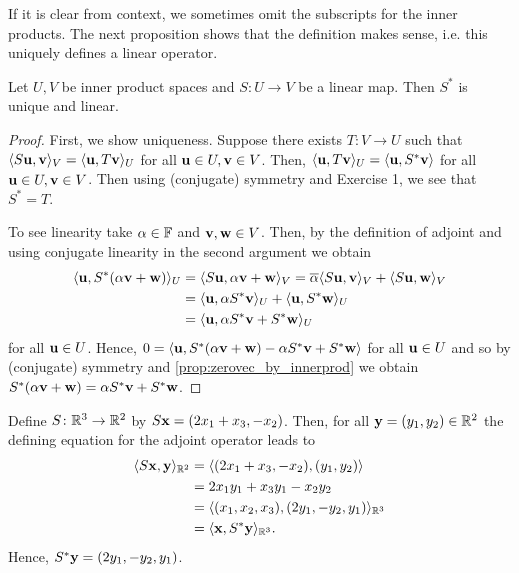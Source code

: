 \documentclass{article}
\begin{document}
If it is clear from context, we sometimes omit the subscripts for the inner products. The next proposition shows that the definition makes sense, i.e. this uniquely defines a linear operator.

\begin{proposition}
Let $U,V$ be inner product spaces and $S\colon U \to V$ be a linear map. Then $S^*$ is unique and linear. 
\end{proposition}

\begin{proof}
First, we show uniqueness. Suppose there exists $T\colon V \to U$ such that $\langle S{\mathbf{u}},{\mathbf{v}} \rangle_V = \langle {\mathbf{u}},T{\mathbf{v}} \rangle_U$ for all ${\mathbf{u}}\in U, {\mathbf{v}}\in V$. Then, $\langle {\mathbf{u}},T{\mathbf{v}} \rangle_U = \langle {\mathbf{u}}, S^*{\mathbf{v}} \rangle$ for all ${\mathbf{u}}\in U, {\mathbf{v}}\in V$. Then using (conjugate) symmetry and Exercise 1, we see that $S^*= T$.

To see linearity take $\alpha\in {\mathbb{F}}$ and ${\mathbf{v}},{\mathbf{w}} \in V$. Then, by the definition of adjoint and using  conjugate linearity in the second argument we obtain 
\begin{align*}
    \langle {\mathbf{u}}, S^*(\alpha{\mathbf{v}}+{\mathbf{w}}) \rangle_U &= \langle S{\mathbf{u}},\alpha{\mathbf{v}}+{\mathbf{w}} \rangle_V =\overline{\alpha}\langle S{\mathbf{u}},{\mathbf{v}} \rangle_V + \langle S{\mathbf{u}},{\mathbf{w}} \rangle_V\\
   &=\langle {\mathbf{u}},\alpha S^*{\mathbf{v}} \rangle_U + \langle {\mathbf{u}},S^*{\mathbf{w}} \rangle_U\\ &= \langle {\mathbf{u}},\alpha S^*{\mathbf{v}}+ S^*{\mathbf{w}} \rangle_U
\end{align*}
for all ${\mathbf{u}} \in U$. Hence, $0 = \langle {\mathbf{u}}, S^*(\alpha{\mathbf{v}}+{\mathbf{w}})- \alpha S^*{\mathbf{v}}+ S^*{\mathbf{w}} \rangle$ for all ${\mathbf{u}}\in U$ and so by (conjugate) symmetry and \cref{prop:zerovec_by_innerprod} we obtain $S^*(\alpha{\mathbf{v}}+{\mathbf{w}}) = \alpha S^*{\mathbf{v}}+ S^*{\mathbf{w}}$. 
\end{proof}

\begin{example}
Define $S \colon {\mathbb{R}}^3 \to {\mathbb{R}}^2$ by $S{\mathbf{x}} = (2x_1+x_3,-x_2)$. Then, for all ${\mathbf{y}}= (y_1,y_2) \in {\mathbb{R}}^2$ the defining equation for the adjoint operator leads to
\begin{align*}
    \langle S{\mathbf{x}}, {\mathbf{y}} \rangle_{{\mathbb{R}}^2} &= \langle (2x_1+x_3,-x_2), (y_1,y_2) \rangle \\
    &= 2x_1y_1 +x_3y_1-x_2y_2\\
    &= \langle (x_1,x_2,x_3),(2y_1,-y_2,y_1) \rangle_{{\mathbb{R}}^3}\\
    &= \langle {\mathbf{x}},S^*{\mathbf{y}} \rangle_{{\mathbb{R}}^3}.
\end{align*}
Hence, $S^*{\mathbf{y}} = (2y_1,-y_2,y_1)$.
\end{example}
\end{document}
